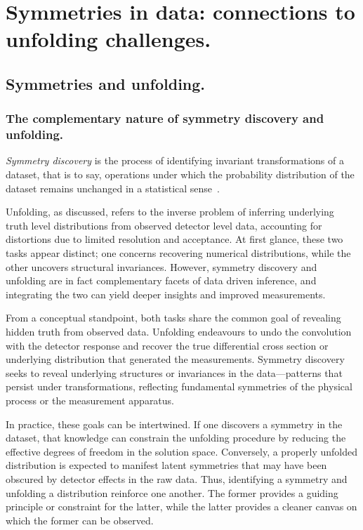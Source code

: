 \chapter{Symmetries in data: connections to unfolding challenges.}
\label{chap:symmetrygan}
\chapterminitoc
\section{Symmetries and unfolding.}
    \subsection{The complementary nature of symmetry discovery and unfolding.}
        \begin{definition}
                     \emph{Symmetry discovery} is the process of identifying invariant transformations of a dataset, that is to say, operations under which the probability distribution of the dataset remains unchanged in a statistical sense~\cite{shaw_lie_2025, shaw_symmetry_2024, hagemeyer_learning_2022}.
        \end{definition}
        
        Unfolding, as discussed, refers to the inverse problem of inferring underlying truth level distributions from observed detector level data, accounting for distortions due to limited resolution and acceptance.
        At first glance, these two tasks appear distinct;
        one concerns recovering numerical distributions, while the other uncovers structural invariances.
        However, symmetry discovery and unfolding are in fact complementary facets of data driven inference, and integrating the two can yield deeper insights and improved measurements.
    
        From a conceptual standpoint, both tasks share the common goal of revealing hidden truth from observed data.
        Unfolding endeavours to undo the convolution with the detector response and recover the true differential cross section or underlying distribution that generated the measurements.
        Symmetry discovery seeks to reveal underlying structures or invariances in the data---patterns that persist under transformations, reflecting fundamental symmetries of the physical process or the measurement apparatus.
    
        In practice, these goals can be intertwined.
        If one discovers a symmetry in the dataset, that knowledge can constrain the unfolding procedure by reducing the effective degrees of freedom in the solution space.
        Conversely, a properly unfolded distribution is expected to manifest latent symmetries that may have been obscured by detector effects in the raw data.
        Thus, identifying a symmetry and unfolding a distribution reinforce one another.
        The former provides a guiding principle or constraint for the latter, while the latter provides a cleaner canvas on which the former can be observed.
    
